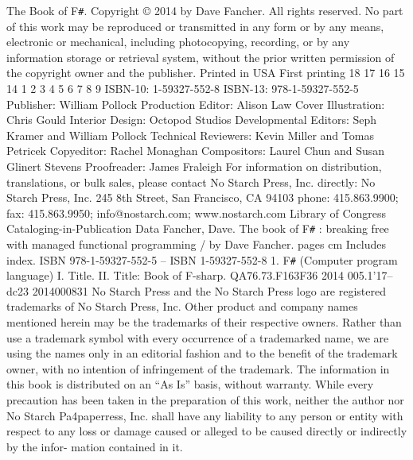 \documentclass{book}
\begin{document}
The Book of F\verb|#|. Copyright © 2014 by Dave Fancher.
All rights reserved. No part of this work may be reproduced or transmitted in any form or by any means, electronic
or mechanical, including photocopying, recording, or by any information storage or retrieval system, without the
prior written permission of the copyright owner and the publisher.
Printed in USA
First printing
18 17 16 15 14   1 2 3 4 5 6 7 8 9
ISBN-10: 1-59327-552-8
ISBN-13: 978-1-59327-552-5
Publisher: William Pollock
Production Editor: Alison Law
Cover Illustration: Chris Gould
Interior Design: Octopod Studios
Developmental Editors: Seph Kramer and William Pollock
Technical Reviewers: Kevin Miller and Tomas Petricek
Copyeditor: Rachel Monaghan
Compositors: Laurel Chun and Susan Glinert Stevens
Proofreader: James Fraleigh
For information on distribution, translations, or bulk sales, please contact No Starch Press, Inc. directly:
No Starch Press, Inc.
245 8th Street, San Francisco, CA 94103
phone: 415.863.9900; fax: 415.863.9950; info@nostarch.com; www.nostarch.com
Library of Congress Cataloging-in-Publication Data
Fancher, Dave.
The book of F\verb|#| : breaking free with managed functional programming / by Dave Fancher.
pages cm
Includes index.
ISBN 978-1-59327-552-5 -- ISBN 1-59327-552-8
1. F\verb|#| (Computer program language) I. Title. II. Title: Book of F-sharp.
QA76.73.F163F36 2014
005.1'17--dc23
2014000831
No Starch Press and the No Starch Press logo are registered trademarks of No Starch Press, Inc. Other product and
company names mentioned herein may be the trademarks of their respective owners. Rather than use a trademark
symbol with every occurrence of a trademarked name, we are using the names only in an editorial fashion and to
the benefit of the trademark owner, with no intention of infringement of the trademark.
The information in this book is distributed on an “As Is” basis, without warranty. While every precaution has been
taken in the preparation of this work, neither the author nor No Starch Pa4paperress, Inc. shall have any liability to any
person or entity with respect to any loss or damage caused or alleged to be caused directly or indirectly by the infor-
mation contained in it.
\end{document}
